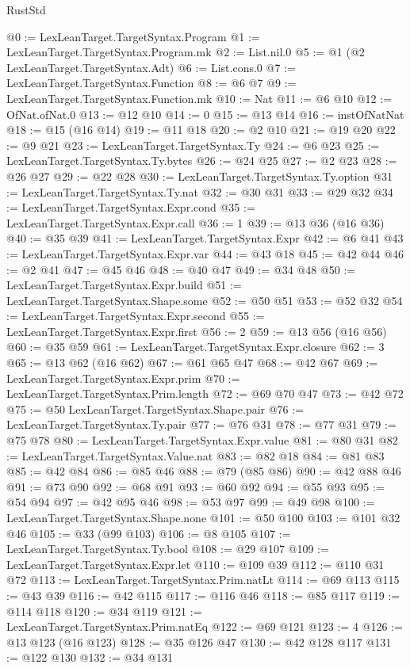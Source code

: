 \begin{lexlean}{RustStd}
\begin{coremodule}
@0 := LexLeanTarget.TargetSyntax.Program
@1 := LexLeanTarget.TargetSyntax.Program.mk
@2 := List.nil.{0}
@5 := @1 (@2 LexLeanTarget.TargetSyntax.Adt)
@6 := List.cons.{0}
@7 := LexLeanTarget.TargetSyntax.Function
@8 := @6 @7
@9 := LexLeanTarget.TargetSyntax.Function.mk
@10 := Nat
@11 := @6 @10
@12 := OfNat.ofNat.{0}
@13 := @12 @10
@14 := 0
@15 := @13 @14
@16 := instOfNatNat
@18 := @15 (@16 @14)
@19 := @11 @18
@20 := @2 @10
@21 := @19 @20
@22 := @9 @21
@23 := LexLeanTarget.TargetSyntax.Ty
@24 := @6 @23
@25 := LexLeanTarget.TargetSyntax.Ty.bytes
@26 := @24 @25
@27 := @2 @23
@28 := @26 @27
@29 := @22 @28
@30 := LexLeanTarget.TargetSyntax.Ty.option
@31 := LexLeanTarget.TargetSyntax.Ty.nat
@32 := @30 @31
@33 := @29 @32
@34 := LexLeanTarget.TargetSyntax.Expr.cond
@35 := LexLeanTarget.TargetSyntax.Expr.call
@36 := 1
@39 := @13 @36 (@16 @36)
@40 := @35 @39
@41 := LexLeanTarget.TargetSyntax.Expr
@42 := @6 @41
@43 := LexLeanTarget.TargetSyntax.Expr.var
@44 := @43 @18
@45 := @42 @44
@46 := @2 @41
@47 := @45 @46
@48 := @40 @47
@49 := @34 @48
@50 := LexLeanTarget.TargetSyntax.Expr.build
@51 := LexLeanTarget.TargetSyntax.Shape.some
@52 := @50 @51
@53 := @52 @32
@54 := LexLeanTarget.TargetSyntax.Expr.second
@55 := LexLeanTarget.TargetSyntax.Expr.first
@56 := 2
@59 := @13 @56 (@16 @56)
@60 := @35 @59
@61 := LexLeanTarget.TargetSyntax.Expr.closure
@62 := 3
@65 := @13 @62 (@16 @62)
@67 := @61 @65 @47
@68 := @42 @67
@69 := LexLeanTarget.TargetSyntax.Expr.prim
@70 := LexLeanTarget.TargetSyntax.Prim.length
@72 := @69 @70 @47
@73 := @42 @72
@75 := @50 LexLeanTarget.TargetSyntax.Shape.pair
@76 := LexLeanTarget.TargetSyntax.Ty.pair
@77 := @76 @31
@78 := @77 @31
@79 := @75 @78
@80 := LexLeanTarget.TargetSyntax.Expr.value
@81 := @80 @31
@82 := LexLeanTarget.TargetSyntax.Value.nat
@83 := @82 @18
@84 := @81 @83
@85 := @42 @84
@86 := @85 @46
@88 := @79 (@85 @86)
@90 := @42 @88 @46
@91 := @73 @90
@92 := @68 @91
@93 := @60 @92
@94 := @55 @93
@95 := @54 @94
@97 := @42 @95 @46
@98 := @53 @97
@99 := @49 @98
@100 := LexLeanTarget.TargetSyntax.Shape.none
@101 := @50 @100
@103 := @101 @32 @46
@105 := @33 (@99 @103)
@106 := @8 @105
@107 := LexLeanTarget.TargetSyntax.Ty.bool
@108 := @29 @107
@109 := LexLeanTarget.TargetSyntax.Expr.let
@110 := @109 @39
@112 := @110 @31 @72
@113 := LexLeanTarget.TargetSyntax.Prim.natLt
@114 := @69 @113
@115 := @43 @39
@116 := @42 @115
@117 := @116 @46
@118 := @85 @117
@119 := @114 @118
@120 := @34 @119
@121 := LexLeanTarget.TargetSyntax.Prim.natEq
@122 := @69 @121
@123 := 4
@126 := @13 @123 (@16 @123)
@128 := @35 @126 @47
@130 := @42 @128 @117
@131 := @122 @130
@132 := @34 @131

\end{coremodule}
\end{lexlean}
